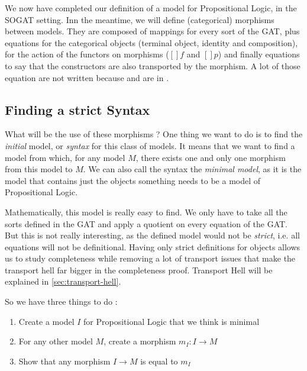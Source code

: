 \documentclass[10pt,a4paper]{article}
\begin{document}
			We now have completed our definition of a model for Propositional Logic, in the SOGAT setting. Inn the meantime, we will define (categorical) morphisms between models. They are composed of mappings for every sort of the GAT, plus equations for the categorical objects (terminal object, identity and composition), for the action of the functors on morphisms ($[]f$ and $[]p$) and finally equations to say that the constructors are also transported by the morphism. A lot of those equation are not written because  and  are in \Prop{}.
			\begin{tcolorbox}
				\agdasep
			\end{tcolorbox}
		
		\subsection{Finding a strict Syntax}
			
			What will be the use of these morphisms ? One thing we want to do is to find the \emph{initial} model, or \emph{syntax} for this class of models. It means that we want to find a model from which, for any model $M$, there exists one and only one morphism from this model to $M$. We can also call the syntax the \emph{minimal model}, as it is the model that contains just the objects something needs to be a model of Propositional Logic.
			
			Mathematically, this model is really easy to find. We only have to take all the sorts defined in the GAT and apply a quotient on every equation of the GAT. But this is not really interesting, as the defined model would not be \emph{strict}, i.e. all equations will not be definitional. Having only strict definitions for objects allows us to study completeness while removing a lot of transport issues that make the transport hell far bigger in the completeness proof. Transport Hell will be explained in \autoref{sec:transport-hell}.
			
			So we have three things to do :
			\begin{enumerate}
				\setlength{\itemsep}{-1ex}
				\item Create a model $I$ for Propositional Logic that we think is minimal
				\item For any other model $M$, create a morphism $m_I : I \to M$
				\item Show that any morphism $I \to M$ is equal to $m_I$
			\end{enumerate}
		
\end{document}
